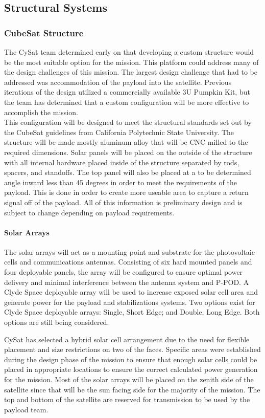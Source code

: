 \documentclass[nocover]            %
{CSLI}                       %
\begin{document}
\subsection{Structural Systems}
\subsubsection{CubeSat Structure}
The CySat team determined early on that developing a custom structure would be the most suitable option for the mission. This platform could address many of the design challenges of this mission. The largest design challenge that had to be addressed was accommodation of the payload into the satellite. Previous iterations of the design utilized a commercially available 3U Pumpkin Kit, but the team has determined that a custom configuration will be more effective to accomplish the mission.\\
\indent This configuration will be designed to meet the structural standards set out by the CubeSat guidelines from California Polytechnic State University. The structure will be made mostly aluminum alloy that will be CNC milled to the required dimensions. Solar panels will be placed on the outside of the structure with all internal hardware placed inside of the structure separated by rods, spacers, and standoffs. The top panel will also be placed at a to be determined angle inward less than 45 degrees in order to meet the requirements of the payload. This is done in order to create more useable area to capture a return signal off of the payload. All of this information is preliminary design and is subject to change depending on payload requirements.
 
\paragraph{Solar Arrays\\}
The solar arrays will act as a mounting point and substrate for the photovoltaic cells and communications antennas. Consisting of six hard mounted panels and four deployable panels, the array will be configured to ensure optimal power delivery and minimal interference between the antenna system and P-POD. A Clyde Space deployable array will be used to increase exposed solar cell area and generate power for the payload and stabilizations systems. Two options exist for Clyde Space deployable arrays: Single, Short Edge; and Double, Long Edge. Both options are still being considered.

CySat has selected a hybrid solar cell arrangement due to the need for flexible placement and size restrictions on two of the faces. Specific areas were established during the design phase of the mission to ensure that enough solar cells could be placed in appropriate locations to ensure the correct calculated power generation for the mission. Most of the solar arrays will be placed on the zenith side of the satellite since that will be the sun facing side for the majority of the mission. The top and bottom of the satellite are reserved for transmission to be used by the payload team.  
\end{document}
